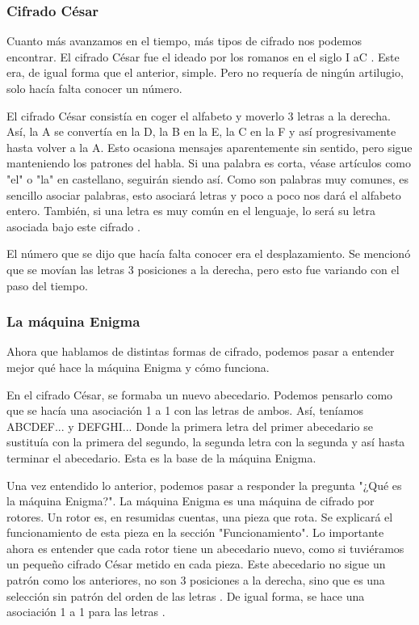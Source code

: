 \subsubsection {Cifrado César}

Cuanto más avanzamos en el tiempo, más tipos de cifrado nos podemos encontrar. El cifrado César fue el ideado por los romanos en el siglo I aC \cite{muy_interesante_encriptar}. Este era, de igual forma que el anterior, simple. Pero no requería de ningún artilugio, solo hacía falta conocer un número.

El cifrado César consistía en coger el alfabeto y moverlo 3 letras a la derecha. Así, la A se convertía en la D, la B en la E, la C en la F y así progresivamente hasta volver a la A. Esto ocasiona mensajes aparentemente sin sentido, pero sigue manteniendo los patrones del habla. Si una palabra es corta, véase artículos como "el" o "la" en castellano, seguirán siendo así. Como son palabras muy comunes, es sencillo asociar palabras, esto asociará letras y poco a poco nos dará el alfabeto entero. También, si una letra es muy común en el lenguaje, lo será su letra asociada bajo este cifrado \cite{muy_interesante_encriptar}.

El número que se dijo que hacía falta conocer era el desplazamiento. Se mencionó que se movían las letras 3 posiciones a la derecha, pero esto fue variando con el paso del tiempo.

\subsubsection {La máquina Enigma}

Ahora que hablamos de distintas formas de cifrado, podemos pasar a entender mejor qué hace la máquina Enigma y cómo funciona.

En el cifrado César, se formaba un nuevo abecedario. Podemos pensarlo como que se hacía una asociación 1 a 1 con las letras de ambos. Así, teníamos ABCDEF... y DEFGHI... Donde la primera letra del primer abecedario se sustituía con la primera del segundo, la segunda letra con la segunda y así hasta terminar el abecedario. Esta es la base de la máquina Enigma.

Una vez entendido lo anterior, podemos pasar a responder la pregunta "¿Qué es la máquina Enigma?". La máquina Enigma es una máquina de cifrado por rotores. Un rotor es, en resumidas cuentas, una pieza que rota. Se explicará el funcionamiento de esta pieza en la sección "Funcionamiento". Lo importante ahora es entender que cada rotor tiene un abecedario nuevo, como si tuviéramos un pequeño cifrado César metido en cada pieza. Este abecedario no sigue un patrón como los anteriores, no son 3 posiciones a la derecha, sino que es una selección sin patrón del orden de las letras \cite{wiki_enigma_rotor}. De igual forma, se hace una asociación 1 a 1 para las letras \cite{wiki_enigma_rotor}.

